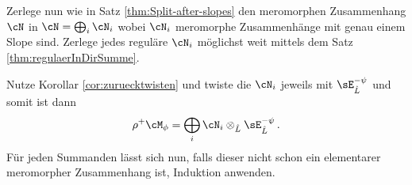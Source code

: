 \begin{comment}
TODO: hier weiter vereinfachen
\end{comment}
Zerlege nun wie in  Satz \ref{thm:Split-after-slopes} den meromorphen
Zusammenhang $\cN$ in $\cN=\bigoplus_i\cN_i$ wobei $\cN_i$ meromorphe
Zusammenhänge mit genau einem Slope sind.
Zerlege jedes reguläre $\cN_i$ möglichst weit mittels dem Satz
\ref{thm:regulaerInDirSumme}.
\begin{comment}
TODO: hier weiter umformulieren, $\tilde\cN_i$ einführen.
\end{comment}
Nutze Korollar \ref{cor:zuruecktwisten} und twiste die $\cN_i$ jeweils mit
$\sE^{-\psi}_{\hat L}$ und somit ist dann
\[
\rho^+\cM_{\phi}=\bigoplus_i\cN_i\otimes_{\hat L}\sE^{-\psi}_{\hat L} \,.
\]
Für jeden Summanden lässt sich nun, falls dieser nicht schon ein elementarer
meromorpher Zusammenhang ist, Induktion anwenden.
\begin{comment}
nicht elementar, sondern regulär otimes E
\end{comment}

